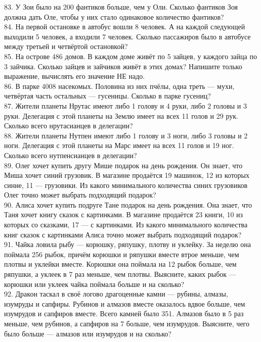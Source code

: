 \documentclass[12pt]{article}
\begin{document}
83. У Зои было на 200 фантиков больше, чем у Оли. Сколько фантиков Зоя должна дать Оле, чтобы у них стало одинаковое количество фантиков?\\
84. На первой остановке в автобус вошли 8 человек. А на каждой следующей выходили 5 человек, а входили 7 человек. Сколько пассажиров было в  автобусе между третьей и четвёртой остановкой?\\
85. На острове 486 домов. В каждом доме живёт по 5 зайцев, у каждого зайца по 3 зайчика. Сколько зайцев и зайчиков живёт в этих домах? Напишите только выражение, вычислять его значение НЕ надо.\\
86. В парке 4008 насекомых. Половина из них пчёлы, одна треть --- мухи, четвёртая часть остальных ---  гусеницы. Сколько в парке гусениц?\\
87. Жители планеты Нрутас имеют либо 1 голову и 4 руки, либо 2 головы и 3 руки. Делегация с этой планеты на Землю имеет на всех 11 голов и 29 рук. Сколько всего нрутасианцев в делегации?\\
88. Жители планеты Нутпен имеют либо 1 голову и 3 ноги, либо 3 головы и 2 ноги. Делегация с этой планеты на Марс имеет на всех 11 голов и 19 ног. Сколько всего нутпенсианцев в делегации?\\
89. Олег хочет купить другу Мише подарок на день рождения. Он знает, что Миша хочет синий грузовик. В магазине продаётся 19 машинок, 12 из которых синие, 11 --- грузовики. Из какого минимального количества синих грузовиков Олег точно может выбрать подходящий подарок?\\
90. Алиса хочет купить подруге Тане подарок на день рождения. Она знает, что Таня хочет книгу сказок с картинками. В магазине продаётся 23 книги, 10 из которых со сказками, 17 --- с картинками. Из какого минимального количества книг сказок с картинками Алиса точно может выбрать подходящий подарок?\\
91. Чайка ловила рыбу --- корюшку, ряпушку, плотву и уклейку. За неделю она поймала 256 рыбок, причём корюшки и ряпушки вместе втрое меньше, чем плотвы и уклейки вместе. Корюшки она поймала на 12 рыбок больше, чем ряпушки, а уклеек в 7 раз меньше, чем плотвы. Выясните, каких рыбок --- корюшки или уклеек чайка поймала больше и на сколько?\\
92. Дракон таскал в своё логово драгоценные камни --- рубины, алмазы, изумруды и сапфиры. Рубинов и алмазов вместе оказалось вдвое больше, чем изумрудов и сапфиров вместе. Всего камней было 351. Алмазов было в 5 раз меньше, чем рубинов, а сапфиров на 7 больше, чем изумрудов. Выясните, чего было больше --- алмазов или изумрудов и на сколько?\\
\end{document}
